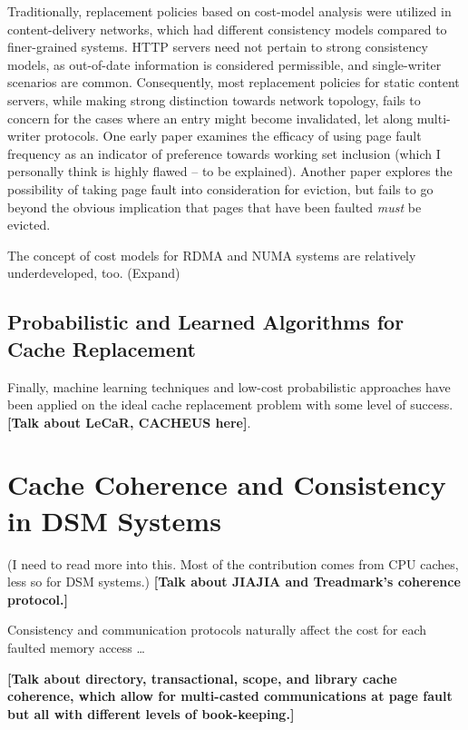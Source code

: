 \documentclass{article}
\begin{document}
Traditionally, replacement policies based on cost-model analysis were utilized in
content-delivery networks, which had different consistency models compared to
finer-grained systems. HTTP servers need not pertain to strong consistency models,
as out-of-date information is considered permissible, and single-writer scenarios
are common. Consequently, most replacement policies for static content servers,
while making strong distinction towards network topology, fails to concern for the
cases where an entry might become invalidated, let along multi-writer protocols.
One early paper \cite{LaRowe_Ellis.Repl_NUMA.1991} examines the efficacy of using
page fault frequency as an indicator of preference towards working set inclusion
(which I personally think is highly flawed -- to be explained). Another paper
\cite{Aguilar_Leiss.Coherence-Replacement.2006} explores the possibility of taking
page fault into consideration for eviction, but fails to go beyond the obvious
implication that pages that have been faulted \emph{must} be evicted.

The concept of cost models for RDMA and NUMA systems are relatively underdeveloped,
too. (Expand)

\subsection{Probabilistic and Learned Algorithms for Cache Replacement}
Finally, machine learning techniques and low-cost probabilistic approaches have
been applied on the ideal cache replacement problem with some level of success.
\textbf{[Talk about LeCaR, CACHEUS here]}.

\section{Cache Coherence and Consistency in DSM Systems}

(I need to read more into this. Most of the contribution comes from CPU caches,
less so for DSM systems.) \textbf{[Talk about JIAJIA and Treadmark's coherence
protocol.]}

Consistency and communication protocols naturally affect the cost for each faulted
memory access \dots

\textbf{[Talk about directory, transactional, scope, and library cache coherence,
which allow for multi-casted communications at page fault but all with different
levels of book-keeping.]}

\printbibliography
\end{document}

